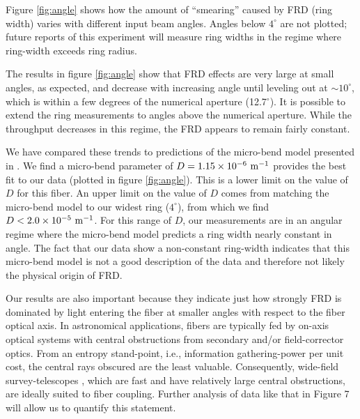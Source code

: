 Figure \ref{fig:angle} shows how the amount of ``smearing'' caused by
FRD (ring width) varies with different input beam angles. Angles below
$4^{\circ}$ are not plotted; future reports of this experiment will
measure ring widths in the regime where ring-width exceeds ring
radius.

The results in figure \ref{fig:angle} show that FRD effects are very
large at small angles, as expected, and decrease with increasing
angle until leveling out at $\sim 10^{\circ}$, which is within a few
degrees of the numerical aperture (12.7$^{\circ}$). It is possible to
extend the ring measurements to angles above the numerical
aperture. While the throughput decreases in this regime, the FRD
appears to remain fairly constant.

We have compared these trends to predictions of the micro-bend model
presented in \citet{Carrasco}.  We find a micro-bend parameter of
$D=1.15\times 10^{-6}~\mathrm{m^{-1}} $ provides the best fit to our data
(plotted in figure \ref{fig:angle}). This is a lower limit on the
value of $D$ for this fiber.  An upper limit on the value of $D$ comes
from matching the micro-bend model to our widest ring ($4^{\circ}$),
from which we find $D<2.0\times 10^{-5}~\mathrm{m^{-1}} $. For this range
of $D$, our measurements are in an angular regime where the micro-bend
model predicts a ring width nearly constant in angle. The fact that
our data show a non-constant ring-width indicates that this micro-bend
model is not a good description of the data and therefore not likely
the physical origin of FRD.

Our results are also important because they indicate just how strongly
FRD is dominated by light entering the fiber at smaller angles with
respect to the fiber optical axis. In astronomical applications,
fibers are typically fed by on-axis optical systems with central
obstructions from secondary and/or field-corrector optics. From an
entropy stand-point, i.e., information gathering-power per unit cost,
the central rays obscured are the least valuable. Consequently,
wide-field survey-telescopes \citep[e.g., SDSS, ][]{York00,Gunn06},
which are fast and have relatively large central obstructions, are
ideally suited to fiber coupling. Further analysis of data like that
in Figure 7 will allow us to quantify this statement.


